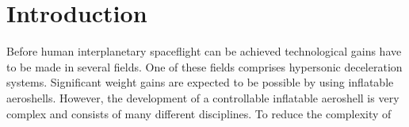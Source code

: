 \section{Introduction}
\label{cha:introduction}
Before human interplanetary spaceflight can be achieved technological gains have to be made in several fields. One of these fields comprises hypersonic deceleration systems. Significant weight gains are expected to be possible by using inflatable aeroshells. However, the development of a controllable inflatable aeroshell is very complex and consists of many different disciplines. To reduce the complexity of 